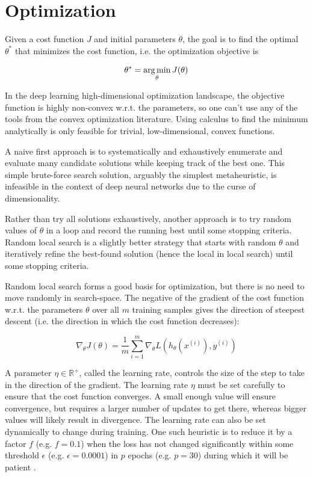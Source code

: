 \section{Optimization}

Given a cost function $J$ and initial parameters $\theta$, the goal is to find the optimal $\theta^*$ that minimizes the cost function, i.e. the optimization objective is

$$
\theta^{*} = \operatorname*{arg\,min}_{\theta} J(\theta)
$$

In the deep learning high-dimensional optimization landscape, the objective function is highly non-convex w.r.t. the parameters, so one can't use any of the tools from the convex optimization literature. Using calculus to find the minimum analytically is only feasible for trivial, low-dimensional, convex functions.

A naive first approach is to systematically and exhaustively enumerate and evaluate many candidate solutions while keeping track of the best one. This simple brute-force search solution, arguably the simplest metaheuristic, is infeasible in the context of deep neural networks due to the curse of dimensionality.

Rather than try all solutions exhaustively, another approach is to try random values of $\theta$ in a loop and record the running best until some stopping criteria. Random local search is a slightly better strategy that starts with random $\theta$ and iteratively refine the best-found solution (hence the local in local search) until some stopping criteria.

Random local search forms a good basis for optimization, but there is no need to move randomly in search-space. The negative of the gradient of the cost function w.r.t. the parameters $\theta$ over all $m$ training samples gives the direction of steepest descent (i.e. the direction in which the cost function decreases):

$$
\nabla_{\theta} J(\theta) = \frac{1}{m} \sum_{i=1}^{m} \nabla_{\theta} L(h_{\theta}(x^{(i)}), y^{(i)})
$$

A parameter $\eta \in \mathbb{{R}^{+}}$, called the learning rate, controls the size of the step to take in the direction of the gradient. The learning rate $\eta$ must be set carefully to ensure that the cost function converges. A small enough value will ensure convergence, but requires a larger number of updates to get there, whereas bigger values will likely result in divergence. The learning rate can also be set dynamically to change during training. One such heuristic is to reduce it by a factor $f$ (e.g. $f=0.1$) when the loss has not changed significantly within some threshold $\epsilon$ (e.g. $\epsilon=0.0001$) in $p$ epochs (e.g. $p=30$) during which it will be patient \cite{learningrateschedules}.

